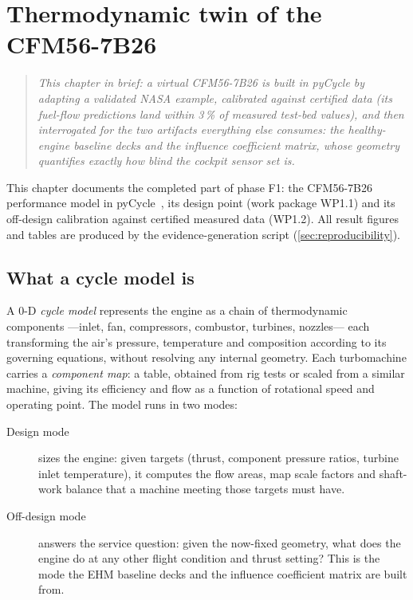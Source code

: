 \chapter{Thermodynamic twin of the CFM56-7B26}
\label{ch:model}

\begin{quote}\itshape
This chapter in brief: a virtual CFM56-7B26 is built in pyCycle by adapting a validated NASA
example, calibrated against certified data (its fuel-flow predictions land within 3\,\% of
measured test-bed values), and then interrogated for the two artifacts everything else
consumes: the healthy-engine baseline decks and the influence coefficient matrix, whose
geometry quantifies exactly how blind the cockpit sensor set is.
\end{quote}



This chapter documents the completed part of phase F1: the CFM56-7B26 performance model in
pyCycle~\cite{Hendricks2019}, its design point (work package WP1.1) and its off-design
calibration against certified measured data (WP1.2). All result figures and tables are produced
by the evidence-generation script (\cref{sec:reproducibility}).

\section{What a cycle model is}

A 0-D \emph{cycle model} represents the engine as a chain of thermodynamic components ---inlet,
fan, compressors, combustor, turbines, nozzles--- each transforming the air's pressure,
temperature and composition according to its governing equations, without resolving any
internal geometry. Each turbomachine carries a \emph{component map}: a table, obtained from rig
tests or scaled from a similar machine, giving its efficiency and flow as a function of
rotational speed and operating point. The model runs in two modes:

\begin{description}
  \item[Design mode] sizes the engine: given targets (thrust, component pressure ratios,
    turbine inlet temperature), it computes the flow areas, map scale factors and shaft-work
    balance that a machine meeting those targets must have.
  \item[Off-design mode] answers the service question: given the now-fixed geometry, what does
    the engine do at any other flight condition and thrust setting? This is the mode the EHM
    baseline decks and the influence coefficient matrix are built from.
\end{description}

